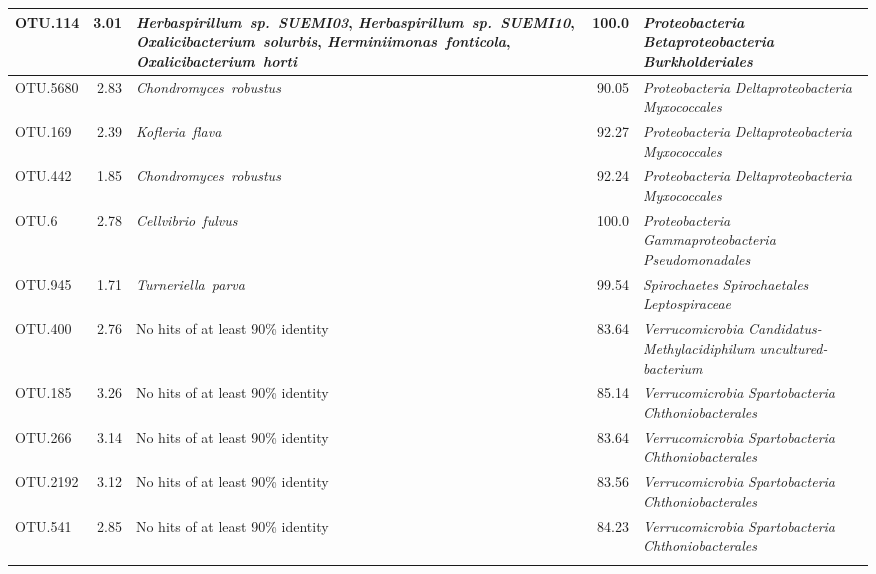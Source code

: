 \documentclass[10pt]{article}
\begin{document}
\begin{longtable}{lrP{5cm}rP{7cm}}
OTU.114 & 3.01 & \mbox{\textit{Herbaspirillum sp. SUEMI03}}, \mbox{\textit{Herbaspirillum sp. SUEMI10}}, \mbox{\textit{Oxalicibacterium solurbis}}, \mbox{\textit{Herminiimonas fonticola}}, \mbox{\textit{Oxalicibacterium horti}} & 100.0 & \mbox{\textit{Proteobacteria}} \mbox{\textit{Betaproteobacteria}} \mbox{\textit{Burkholderiales}} \\ \midrule
OTU.5680 & 2.83 & \mbox{\textit{Chondromyces robustus}} & 90.05 & \mbox{\textit{Proteobacteria}} \mbox{\textit{Deltaproteobacteria}} \mbox{\textit{Myxococcales}} \\ \midrule
OTU.169 & 2.39 & \mbox{\textit{Kofleria flava}} & 92.27 & \mbox{\textit{Proteobacteria}} \mbox{\textit{Deltaproteobacteria}} \mbox{\textit{Myxococcales}} \\ \midrule
OTU.442 & 1.85 & \mbox{\textit{Chondromyces robustus}} & 92.24 & \mbox{\textit{Proteobacteria}} \mbox{\textit{Deltaproteobacteria}} \mbox{\textit{Myxococcales}} \\ \midrule
OTU.6 & 2.78 & \mbox{\textit{Cellvibrio fulvus}} & 100.0 & \mbox{\textit{Proteobacteria}} \mbox{\textit{Gammaproteobacteria}} \mbox{\textit{Pseudomonadales}} \\ \midrule
OTU.945 & 1.71 & \mbox{\textit{Turneriella parva}} & 99.54 & \mbox{\textit{Spirochaetes}} \mbox{\textit{Spirochaetales}} \mbox{\textit{Leptospiraceae}} \\ \midrule
OTU.400 & 2.76 & {No hits of at least 90\% identity} & 83.64 & \mbox{\textit{Verrucomicrobia}} \mbox{\textit{Candidatus-Methylacidiphilum}} \mbox{\textit{uncultured-bacterium}} \\ \midrule
OTU.185 & 3.26 & {No hits of at least 90\% identity} & 85.14 & \mbox{\textit{Verrucomicrobia}} \mbox{\textit{Spartobacteria}} \mbox{\textit{Chthoniobacterales}} \\ \midrule
OTU.266 & 3.14 & {No hits of at least 90\% identity} & 83.64 & \mbox{\textit{Verrucomicrobia}} \mbox{\textit{Spartobacteria}} \mbox{\textit{Chthoniobacterales}} \\ \midrule
OTU.2192 & 3.12 & {No hits of at least 90\% identity} & 83.56 & \mbox{\textit{Verrucomicrobia}} \mbox{\textit{Spartobacteria}} \mbox{\textit{Chthoniobacterales}} \\ \midrule
OTU.541 & 2.85 & {No hits of at least 90\% identity} & 84.23 & \mbox{\textit{Verrucomicrobia}} \mbox{\textit{Spartobacteria}} \mbox{\textit{Chthoniobacterales}} \\ \midrule

\bottomrule
\label{tab:cell}
\end{longtable}
 
\end{document}

